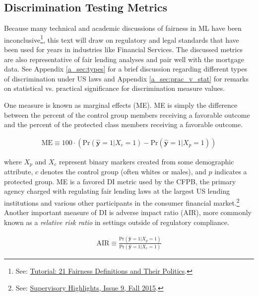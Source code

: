 \documentclass[information,article,submit,moreauthors,pdftex]{definitions/mdpi}
\begin{document}
\subsection{Discrimination Testing Metrics}\label{ssec:di}

Because many technical and academic discussions of fairness in ML have been inconclusive\footnote{See: \href{https://www.youtube.com/watch?v=jIXIuYdnyyk}{Tutorial: 21 Fairness Definitions and Their Politics}.}, this text will draw on regulatory and legal standards that have been used for years in industries like Financial Services. The discussed metrics are also representative of fair lending analyses and pair well with the mortgage data. See Appendix \ref{a_sec:types} for a brief discussion regarding different types of discrimination under US laws and Appendix \ref {a_sec:prac_v_stat} for remarks on statistical vs. practical significance for discrimination measure values.

One measure is known as marginal effects (ME). ME is simply the difference between the percent of the control group members receiving a favorable outcome and the percent of the protected class members receiving a favorable outcome. 

\begin{equation}
\label{eq:me}
\begin{aligned}
\text{ME} \equiv 100 \cdot (\text{Pr}(\hat{\mathbf{y}} = 1| X_c = 1)  - \text{Pr}(\hat{\mathbf{y}} = 1 | X_p = 1))
\end{aligned}
\end{equation}

\noindent where $X_p$ and $X_c$ represent binary markers created from some demographic attribute, $c$ denotes the control group (often whites or males), and $p$ indicates a protected group.  ME is a favored DI metric used by the CFPB, the primary agency charged with regulating fair lending laws at the largest US lending institutions and various other participants in the consumer financial market.\footnote{See: \href{https://files.consumerfinance.gov/f/201510_cfpb_supervisory-highlights.pdf}{Supervisory Highlights, Issue 9, Fall 2015}.} Another important measure of DI is adverse impact ratio (AIR), more commonly known as a \textit{relative risk ratio} in settings outside of regulatory compliance.

\begin{equation}
\label{eq:air}
\begin{aligned}
\text{AIR} \equiv \frac{\text{Pr}(\hat{\mathbf{y}} = 1 | X_p = 1)}{\text{Pr}(\hat{\mathbf{y}} = 1| X_c = 1)}
\end{aligned}
\end{equation}
\end{document}
